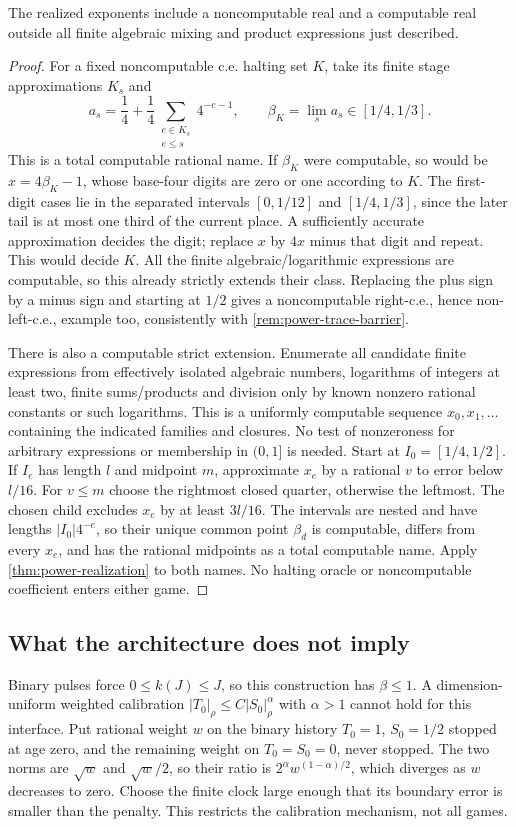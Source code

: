\begin{proposition}\label{prop:power-strict}
The realized exponents include a noncomputable real and a computable real outside all finite algebraic mixing and product expressions just described.
\end{proposition}
\begin{proof}
For a fixed noncomputable c.e. halting set $K$, take its finite stage approximations $K_s$ and
\[
 a_s=\frac14+\frac14\sum_{\substack{e\in K_s\\e\le s}}4^{-e-1},\qquad \beta_K=\lim_s a_s\in[1/4,1/3].
\]
This is a total computable rational name. If $\beta_K$ were computable, so would be $x=4\beta_K-1$, whose base-four digits are zero or one according to $K$. The first-digit cases lie in the separated intervals $[0,1/12]$ and $[1/4,1/3]$, since the later tail is at most one third of the current place. A sufficiently accurate approximation decides the digit; replace $x$ by $4x$ minus that digit and repeat. This would decide $K$. All the finite algebraic/logarithmic expressions are computable, so this already strictly extends their class. Replacing the plus sign by a minus sign and starting at $1/2$ gives a noncomputable right-c.e., hence non-left-c.e., example too, consistently with \cref{rem:power-trace-barrier}.

There is also a computable strict extension. Enumerate all candidate finite expressions from effectively isolated algebraic numbers, logarithms of integers at least two, finite sums/products and division only by known nonzero rational constants or such logarithms. This is a uniformly computable sequence $x_0,x_1,\ldots$ containing the indicated families and closures. No test of nonzeroness for arbitrary expressions or membership in $(0,1]$ is needed.
Start at $I_0=[1/4,1/2]$. If $I_e$ has length $l$ and midpoint $m$, approximate $x_e$ by a rational $v$ to error below $l/16$. For $v\le m$ choose the rightmost closed quarter, otherwise the leftmost. The chosen child excludes $x_e$ by at least $3l/16$. The intervals are nested and have lengths $|I_0|4^{-e}$, so their unique common point $\beta_d$ is computable, differs from every $x_e$, and has the rational midpoints as a total computable name. Apply \cref{thm:power-realization} to both names. No halting oracle or noncomputable coefficient enters either game.
\end{proof}

\subsection{What the architecture does not imply}
Binary pulses force $0\le k(J)\le J$, so this construction has $\beta\le1$. A dimension-uniform weighted calibration $|T_0|_\rho\le C|S_0|_\rho^\alpha$ with $\alpha>1$ cannot hold for this interface. Put rational weight $w$ on the binary history $T_0=1$, $S_0=1/2$ stopped at age zero, and the remaining weight on $T_0=S_0=0$, never stopped. The two norms are $\sqrt w$ and $\sqrt w/2$, so their ratio is $2^\alpha w^{(1-\alpha)/2}$, which diverges as $w$ decreases to zero. Choose the finite clock large enough that its boundary error is smaller than the penalty. This restricts the calibration mechanism, not all games.

